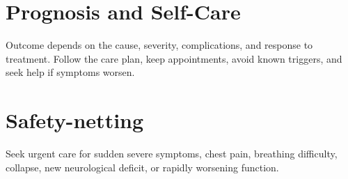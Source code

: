 \section*{Prognosis and Self-Care}
Outcome depends on the cause, severity, complications, and response to treatment. Follow the care plan, keep appointments, avoid known triggers, and seek help if symptoms worsen.
\section*{Safety-netting}
Seek urgent care for sudden severe symptoms, chest pain, breathing difficulty, collapse, new neurological deficit, or rapidly worsening function.
